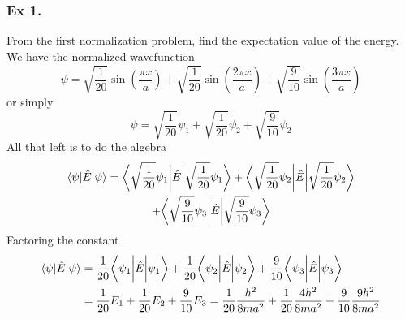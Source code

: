 \documentclass[../../../main.tex]{subfiles}
\begin{document}
\subsubsection{Ex 1.} From the first normalization problem, find the expectation value of the energy. We have the normalized wavefunction
\begin{equation*}
    \psi=\sqrt{\frac{1}{20}}\sin\left(\frac{\pi x}{a}\right) + \sqrt{\frac{1}{20}}\sin\left(\frac{2 \pi x}{a}\right)  +  \sqrt{\frac{9}{10}}\sin\left(\frac{3\pi x}{a}\right) 
\end{equation*}
or simply
\begin{equation*}
    \psi=\sqrt{\frac{1}{20}}\psi_1 + \sqrt{\frac{1}{20}}\psi_2 +  \sqrt{\frac{9}{10}}\psi_2
\end{equation*}
All that left is to do the algebra
\begin{multline*}
    \braket{\psi|\hat{E}|\psi}=\bigg\langle \sqrt{\frac{1}{20}}\psi_1 \bigg| \hat{E}\bigg| \sqrt{\frac{1}{20}} \psi_1\bigg\rangle +
    \bigg\langle \sqrt{\frac{1}{20}}\psi_2 \bigg| \hat{E}\bigg| \sqrt{\frac{1}{20}} \psi_2\bigg\rangle \\
    +\bigg\langle \sqrt{\frac{9}{10}}\psi_3 \bigg| \hat{E}\bigg| \sqrt{\frac{9}{10}} \psi_3\bigg\rangle 
\end{multline*}
Factoring the constant
\begin{align*}
    \braket{\psi|\hat{E}|\psi}&=\frac{1}{20}\bigg\langle \psi_1 \bigg| \hat{E}\bigg|  \psi_1\bigg\rangle +
    \frac{1}{20}\bigg\langle \psi_2 \bigg| \hat{E}\bigg|  \psi_2\bigg\rangle
    +\frac{9}{10}\bigg\langle \psi_3 \bigg| \hat{E}\bigg|  \psi_3\bigg\rangle\\
    &=\frac{1}{20}E_1 + \frac{1}{20}E_2 +\frac{9}{10}E_3=\frac{1}{20}\frac{h^2}{8m a^2} + \frac{1}{20}\frac{4h^2}{8m a^2} +\frac{9}{10}\frac{9h^2}{8m a^2}
\end{align*}
\end{document}
